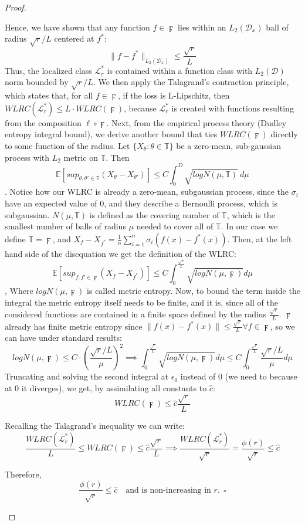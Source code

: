 \documentclass{article}
\newtheorem{proof}{Proof}
\begin{document}
\begin{proof}
\begin{enumerate}
    
    Hence, we have shown that any function \( f \in \digamma \) lies within an \( L_2(\mathcal{D}_x) \) ball of radius \( \sqrt{r}/L \) centered at \( f^* \):
    \[
    \|f - f^*\|_{L_2(\mathcal{D}_x)} \leq \frac{\sqrt{r}}{L}
    \]
    Thus, the localized class $\mathcal{L}_r^*$ is contained within a function class with $L_2(\mathcal{D})$ norm bounded by $\sqrt{r}/L$. We then apply the Talagrand's contraction principle, which states that, for all $f \in \digamma$, if the loss is L-Lipschitz, then $WLRC(\mathcal{L}_r^*) \leq L \cdot  WLRC(\digamma)$, because $\mathcal{L}_r^*$ is created with functions resulting from the composition $\ell \circ \digamma$.
    Next, from the empirical process theory (Dudley entropy integral bound), we derive another bound that ties $WLRC(\digamma)$ directly to some function of the radius.
    Let $\{X_\theta : \theta \in \mathbb{T}\}$ be a zero-mean, sub-gaussian process with $L_2$ metric on $\mathbb{T}$. Then \[
    \mathbb{E}[sup_{\theta, \theta' \in \mathbb{T}}(X_\theta - X_{\theta'})] \leq C \int_{0}^{D} \sqrt{logN(\mu,\mathbb{T})}\ d\mu
    \].
    Notice how our WLRC is already a zero-mean, subgaussian process, since the $\sigma_i$ have an expected value of $0$, and they  describe a Bernoulli process, which is subgaussian.
    $N(\mu,\mathbb{T})$ is defined as the covering number of $\mathbb{T}$, which is the smallest number of balls of radius $\mu$ needed to cover all of $\mathbb{T}$.
    In our case we define $\mathbb{T}=\digamma$, and $X_f-X_{f^*}= \frac{1}{n}\sum_{i=1}^n \sigma_i (f(x)-f^*(x))$. Then, at the left hand side of the disequation we get the definition of the WLRC: \[
    \mathbb{E}[sup_{f, f' \in \digamma}(X_f - X_{f^*})] \leq C \int_{0}^{\frac{\sqrt{r}}{L}}\sqrt{logN(\mu,\digamma)}d\mu
    \],
    Where $logN(\mu,\digamma)$ is called metric entropy. Now, to bound the term inside the integral the metric entropy itself needs to be finite, and it is, since all of the considered functions are contained in a finite space defined by the radius $\frac{\sqrt{r}}{L}$.
    $\digamma$ already has finite metric entropy since $\|f(x)-f^*(x)\| \leq \frac{\sqrt{r}}{L} \forall f \in \digamma$, so we can have under standard results:
    \[
    logN(\mu, \digamma) \leq C \cdot (\frac{\sqrt{r}/L}{\mu})^2 \implies
    \int_{0}^{\frac{\sqrt{r}}{L}}\sqrt{logN(\mu,\digamma)}d\mu \leq C \int_{0}^{\frac{\sqrt{r}}{L}} \frac{\sqrt{r}/L}{\mu}d\mu
    \]
    Truncating and solving the second integral at $\epsilon_0$ instead of $0$ (we need to because at $0$ it diverges), we get, by assimilating all constants to $\hat{c}$:\[
    WLRC(\digamma) \leq \hat{c} \frac{\sqrt{r}}{L}
    \]

    
    Recalling the Talagrand's inequality we can write:
    \[
    \frac{WLRC(\mathcal{L}_r^*)}{L} \leq WLRC(\digamma) \leq \hat{c} \frac{\sqrt{r}}{L} \implies \frac{WLRC(\mathcal{L}_r^*)}{\sqrt{r}} = \frac{\phi(r)}{\sqrt{r}} \leq \hat{c}
    \]
    
    Therefore,
    \[
    \frac{\phi(r)}{\sqrt{r}} \leq \hat{c} \quad \text{and is non-increasing in } r. \ \ \square
    \]
\end{enumerate}

\end{proof}
\end{document}
